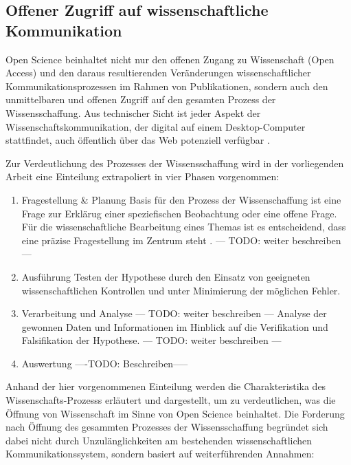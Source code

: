 \subsection{Offener Zugriff auf wissenschaftliche Kommunikation}
Open Science beinhaltet nicht nur den offenen Zugang zu Wissenschaft (Open Access) und den daraus resultierenden Veränderungen wissenschaftlicher Kommunikationsprozessen im Rahmen von Publikationen, sondern auch den unmittelbaren und offenen Zugriff auf den gesamten Prozess der Wissensschaffung. Aus technischer Sicht ist jeder Aspekt der Wissenschaftskommunikation, der digital auf einem Desktop-Computer stattfindet, auch öffentlich über das Web potenziell verfügbar \cite{mietchen2012wissenschaft}. 

Zur Verdeutlichung des Prozesses der Wissensschaffung wird in der vorliegenden Arbeit eine Einteilung extrapoliert in vier Phasen vorgenommen:
\begin{enumerate}
\item Fragestellung & Planung
Basis für den Prozess der Wissenschaffung ist eine Frage zur Erklärug einer speziefischen Beobachtung oder eine offene Frage\cite{suchen}. Für die wissenschaftliche Bearbeitung eines Themas ist es entscheidend, dass eine präzise Fragestellung im Zentrum steht \cite{suchen}. --- TODO: weiter beschreiben ---
\item Ausführung
Testen der Hypothese durch den Einsatz von geeigneten wissenschaftlichen Kontrollen und unter Minimierung der möglichen Fehler.
\item Verarbeitung und Analyse --- TODO: weiter beschreiben ---
Analyse der gewonnen Daten und Informationen im Hinblick auf die Verifikation und Falsifikation der Hypothese. --- TODO: weiter beschreiben ---
\item Auswertung
----TODO: Beschreiben-----
\end{enumerate}

Anhand der hier vorgenommenen Einteilung werden die Charakteristika des Wissenschafts-Prozesss erläutert und dargestellt, um zu verdeutlichen, was die Öffnung von Wissenschaft im Sinne von Open Science beinhaltet. Die Forderung nach Öffnung des gesammten Prozesses der Wissensschaffung begründet sich dabei nicht durch Unzulänglichkeiten am bestehenden wissenschaftlichen Kommunikationssystem, sondern basiert auf weiterführenden Annahmen:

